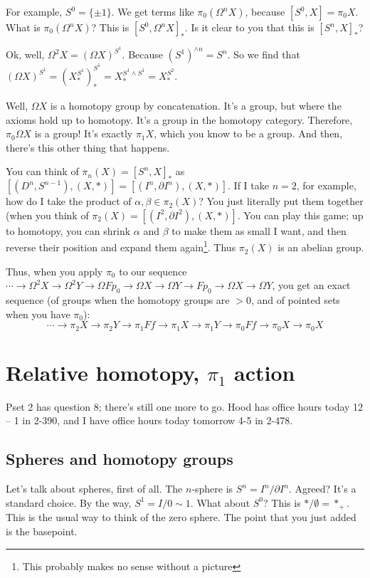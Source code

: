 For example, $S^0=\{\pm 1\}$. We get terms like $\pi_0(\Omega^n X)$, because $[S^0,X] = \pi_0 X$. What is $\pi_0(\Omega^n X)$? This is $[S^0,\Omega^n X]_\ast$. Is it clear to you that this is $[S^n,X]_\ast$?

Ok, well, $\Omega^2 X = (\Omega X)^{S^1}$. Because $(S^1)^{\wedge n} = S^n$. So we find that $(\Omega X)^{S^1} = (X^{S^1}_\ast)^{S^1}_\ast = X_\ast^{S^1\wedge S^1} = X_\ast^{S^2}$.

Well, $\Omega X$ is a homotopy group by concatenation. It's a group, but where the axioms hold up to homotopy. It's a group in the homotopy category. Therefore, $\pi_0 \Omega X$ is a group! It's exactly $\pi_1 X$, which you know to be a group. And then, there's this other thing that happens.

You can think of $\pi_n(X) = [S^n,X]_\ast$ as $[(D^n,S^{n-1}),(X,\ast)] = [(I^n,\partial I^n),(X,\ast)]$. If I take $n=2$, for example, how do I take the product of $\alpha,\beta\in \pi_2(X)$? You just literally put them together (when you think of $\pi_2(X) = [(I^2,\partial I^2),(X,\ast)]$. You can play this game; up to homotopy, you can shrink $\alpha$ and $\beta$ to make them as small I want, and then reverse their position and expand them again\footnote{This probably makes no sense without a picture}. Thus $\pi_2(X)$ is an abelian group.

Thus, when you apply $\pi_0$ to our sequence $\cdots\to\Omega^2 X\to\Omega^2 Y\to \Omega Fp_0\to \Omega X\to \Omega Y\to Fp_0\to \Omega X\to \Omega Y$, you get an exact sequence (of groups when the homotopy groups are $>0$, and of pointed sets when you have $\pi_0$):
$$\cdots\to \pi_2 X\to \pi_2 Y\to \pi_1 Ff\to \pi_1 X\to\pi_1 Y\to\pi_0 Ff\to\pi_0 X\to \pi_0 X$$
\chapter{Relative homotopy, $\pi_1$ action}
Pset 2 has question 8; there's still one more to go. Hood has office hours today 12 -- 1 in 2-390, and I have office hours today tomorrow 4-5 in 2-478.
\section{Spheres and homotopy groups}
Let's talk about spheres, first of all. The $n$-sphere is $S^n=I^n/\partial I^n$. Agreed? It's a standard choice. By the way, $S^1 = I/0\sim 1$. What about $S^0$? This is $\ast/\emptyset = \ast_+$. This is the usual way to think of the zero sphere. The point that you just added is the basepoint.

